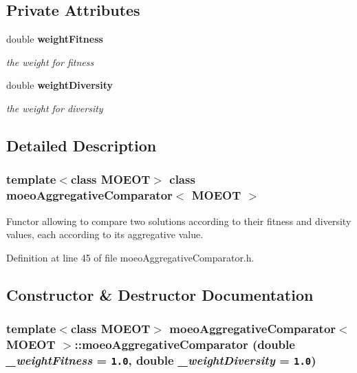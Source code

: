 \subsection*{Private Attributes}
\begin{CompactItemize}
\item 
double \bf{weight\-Fitness}\label{classmoeoAggregativeComparator_9ddf44b9e447bee8503c5b9cad9a7df0}

\begin{CompactList}\small\item\em the weight for fitness \item\end{CompactList}\item 
double \bf{weight\-Diversity}\label{classmoeoAggregativeComparator_d4ce25f797af0218c6c8cfca7c73b2d3}

\begin{CompactList}\small\item\em the weight for diversity \item\end{CompactList}\end{CompactItemize}


\subsection{Detailed Description}
\subsubsection*{template$<$class MOEOT$>$ class moeo\-Aggregative\-Comparator$<$ MOEOT $>$}

Functor allowing to compare two solutions according to their fitness and diversity values, each according to its aggregative value. 



Definition at line 45 of file moeo\-Aggregative\-Comparator.h.

\subsection{Constructor \& Destructor Documentation}
\subsubsection{\setlength{\rightskip}{0pt plus 5cm}template$<$class MOEOT$>$ \bf{moeo\-Aggregative\-Comparator}$<$ MOEOT $>$::\bf{moeo\-Aggregative\-Comparator} (double {\em \_\-weight\-Fitness} = {\tt 1.0}, double {\em \_\-weight\-Diversity} = {\tt 1.0})\hspace{0.3cm}{\tt  [inline]}}\label{classmoeoAggregativeComparator_76cc4d0f5f9bd4984c77410ad8142914}


